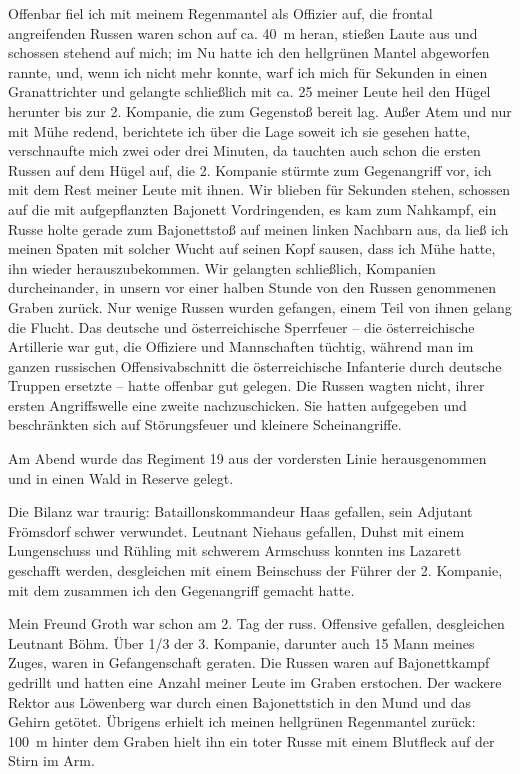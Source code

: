 Offenbar fiel ich mit meinem Regenmantel als Offizier auf, die frontal angreifenden Russen waren schon auf ca. 40~m heran, stießen Laute aus und schossen stehend auf mich; im Nu hatte ich den hellgrünen Mantel abgeworfen rannte, und, wenn ich nicht mehr konnte, warf ich mich für Sekunden in einen Granattrichter und gelangte schließlich mit ca. 25 meiner Leute heil den Hügel herunter bis zur 2. Kompanie, die zum Gegenstoß bereit lag. Außer Atem und nur mit Mühe redend, berichtete ich über die Lage soweit ich sie gesehen hatte, verschnaufte mich zwei oder drei Minuten, da tauchten auch schon die ersten Russen auf dem Hügel auf, die 2. Kompanie stürmte zum Gegenangriff vor, ich mit dem Rest meiner Leute mit ihnen. Wir blieben für Sekunden stehen, schossen auf die mit aufgepflanzten Bajonett Vordringenden, es kam zum Nahkampf, ein Russe holte gerade zum Bajonettstoß auf meinen linken Nachbarn aus, da ließ ich meinen Spaten mit solcher Wucht auf seinen Kopf sausen, dass ich Mühe hatte, ihn wieder herauszubekommen. Wir gelangten schließlich, Kompanien durcheinander, in unsern vor einer halben Stunde von den Russen genommenen Graben zurück. Nur wenige Russen wurden gefangen, einem Teil von ihnen gelang die Flucht. Das deutsche und österreichische Sperrfeuer -- die österreichische Artillerie war gut, die Offiziere und Mannschaften tüchtig, während man im ganzen russischen Offensivabschnitt die österreichische Infanterie durch deutsche Truppen ersetzte -- hatte offenbar gut gelegen. Die Russen wagten nicht, ihrer ersten Angriffswelle eine zweite nachzuschicken. Sie hatten aufgegeben und beschränkten sich auf Störungsfeuer und kleinere Scheinangriffe.

Am Abend wurde das Regiment 19 aus der vordersten Linie herausgenommen und in einen Wald in Reserve gelegt.

Die Bilanz war traurig: Bataillonskommandeur Haas gefallen, sein Adjutant Frömsdorf schwer verwundet. Leutnant Niehaus gefallen, Duhst mit einem Lungenschuss und Rühling mit schwerem Armschuss konnten ins Lazarett geschafft werden, desgleichen mit einem Beinschuss der Führer der 2. Kompanie, mit dem zusammen ich den Gegenangriff gemacht hatte.

Mein Freund Groth war schon am 2. Tag der russ. Offensive gefallen, desgleichen Leutnant Böhm. Über 1/3 der 3. Kompanie, darunter auch 15 Mann meines Zuges, waren in Gefangenschaft geraten. Die Russen waren auf Bajonettkampf gedrillt und hatten eine Anzahl meiner Leute im Graben erstochen. Der wackere Rektor aus Löwenberg war durch einen Bajonettstich in den Mund und das Gehirn getötet. Übrigens erhielt ich meinen hellgrünen Regenmantel zurück: 100~m hinter dem Graben hielt ihn ein toter Russe mit einem Blutfleck auf der Stirn im Arm.

